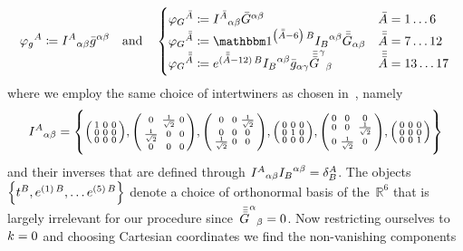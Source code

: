 \begin{equation}
	\metdof^A\defeq\intertw{A}{\alpha\beta}\metbar^{\alpha\beta} \quad \text{and} \quad \begin{cases}
		\armetdof^\overbar{A}\defeq\intertw{\overbar{A}}{\alpha\beta}\armetbar^{\alpha\beta} &\overbar{A}=1\cont 6\\
		\armetdof^\overbar{\overbar{A}}\defeq\idmat^{\left(\overbar{\overbar{A}}-6\right)\,B}\invintertw{B}{\alpha\beta}\armetbbar_{\alpha\beta} &\overbar{\overbar{A}}=7\cont 12\\
		\armetdof^\overbar{\overbar{\overbar{A}}}\defeq e^{(\overbar{\overbar{\overbar{A}}}-12)\,B}\invintertw{B}{\alpha\beta}\metbar_{\alpha\gamma}{\armetbbbar^\gamma}_\beta &\overbar{\overbar{\overbar{A}}}=13\cont 17
	\end{cases}
\end{equation}
 where we employ the same choice of intertwiners as chosen in~\autocite{Schuller2016}, namely~\autocite{Reiss}
\begin{equation}
	{I^{A}}_{\alpha\beta}=\left\{
		\begin{psmallmatrix}1&0&0\\0&0&0\\0&0&0\end{psmallmatrix},
		\begin{psmallmatrix}0&\frac{1}{\sqrt{2}}&0\\\frac{1}{\sqrt{2}}&0&0\\0&0&0\end{psmallmatrix},
		\begin{psmallmatrix}0&0&\frac{1}{\sqrt{2}}\\0&0&0\\\frac{1}{\sqrt{2}}&0&0\end{psmallmatrix},
		\begin{psmallmatrix}0&0&0\\0&1&0\\0&0&0\end{psmallmatrix},
		\begin{psmallmatrix}0&0&0\\0&0&\frac{1}{\sqrt{2}}\\0&\frac{1}{\sqrt{2}}&0\end{psmallmatrix},
		\begin{psmallmatrix}0&0&0\\0&0&0\\0&0&1\end{psmallmatrix}
	\right\}
\end{equation}
and their inverses that are defined through ${I^{A}}_{\alpha\beta}{I_{B}}^{\alpha\beta}=\delta^A_B$. The objects~$\left\{t^B,e^{(1)\,B},\ldots e^{(5)\,B}\right\}$ denote a choice of orthonormal basis of the~$\mathbb{R}^6$ that is largely irrelevant for our procedure since~${{\bar{{\bar{{\bar{G}}}}}}^\alpha}_\beta=0$. Now restricting ourselves to~$k=0$ and choosing Cartesian coordinates we find the non-vanishing components
